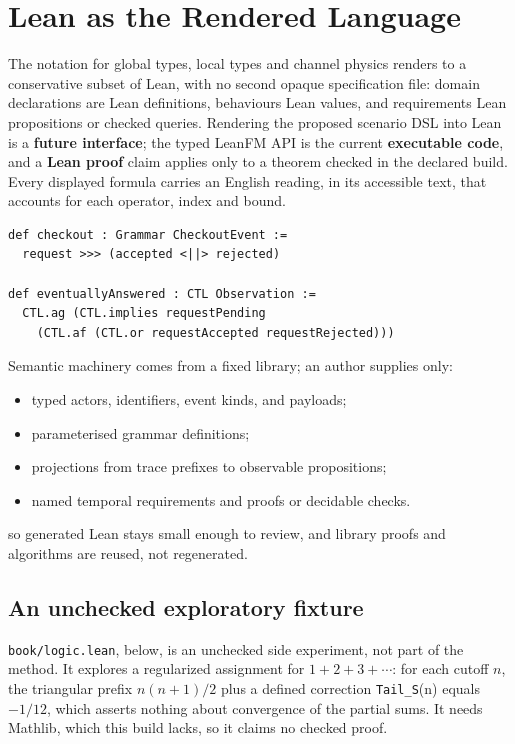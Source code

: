 \chapter{Lean as the Rendered Language}
\label{ch:lean}

The notation for global types, local types and channel physics renders to a
conservative subset of Lean, with no second opaque specification file: domain
declarations are Lean definitions, behaviours Lean values, and requirements Lean
propositions or checked queries. Rendering the proposed scenario DSL into Lean is a
\textbf{future interface}; the typed LeanFM API is the current
\textbf{executable code}, and a \textbf{Lean proof} claim applies only to a theorem
checked in the declared build. Every displayed formula carries an English reading,
in its accessible text, that accounts for each operator, index and bound.

\begin{lstlisting}
def checkout : Grammar CheckoutEvent :=
  request >>> (accepted <||> rejected)

def eventuallyAnswered : CTL Observation :=
  CTL.ag (CTL.implies requestPending
    (CTL.af (CTL.or requestAccepted requestRejected)))
\end{lstlisting}

Semantic machinery comes from a fixed library; an author supplies only:

\begin{itemize}
  \item typed actors, identifiers, event kinds, and payloads;
  \item parameterised grammar definitions;
  \item projections from trace prefixes to observable propositions;
  \item named temporal requirements and proofs or decidable checks.
\end{itemize}

so generated Lean stays small enough to review, and library proofs and algorithms
are reused, not regenerated.

\section{An unchecked exploratory fixture}

\texttt{book/logic.lean}, below, is an unchecked side experiment, not part of the
method. It explores a regularized assignment for $1+2+3+\cdots$: for each cutoff
$n$, the triangular prefix $n(n+1)/2$ plus a defined correction
\texttt{Tail\_S}(n) equals $-1/12$, which asserts nothing about convergence of the
partial sums. It needs Mathlib, which this build lacks, so it claims no checked
proof.


